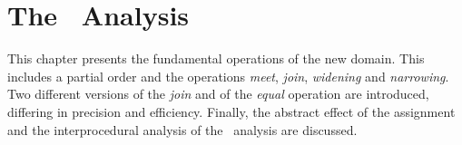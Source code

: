 \chapter{The \cpo\ Analysis}\label{chapter:analysis}

This chapter presents the fundamental operations of the new domain.
This includes a partial order and the operations \emph{meet}, \emph{join}, \emph{widening} and \emph{narrowing}.
Two different versions of the \emph{join} and of the \emph{equal} operation are introduced,
differing in precision and efficiency.
Finally, the abstract effect of the assignment and the interprocedural analysis of the \cpo\ analysis are discussed.





